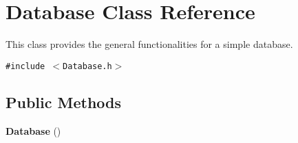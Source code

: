 \section{Database Class Reference}
\label{classDatabase}
This class provides the general functionalities for a simple database. 


{\tt \#include $<$Database.h$>$}

\subsection*{Public Methods}
\begin{CompactItemize}
\item 
{}
{\bf Database} ()\label{classDatabase_a0}


\end{CompactItemize}
